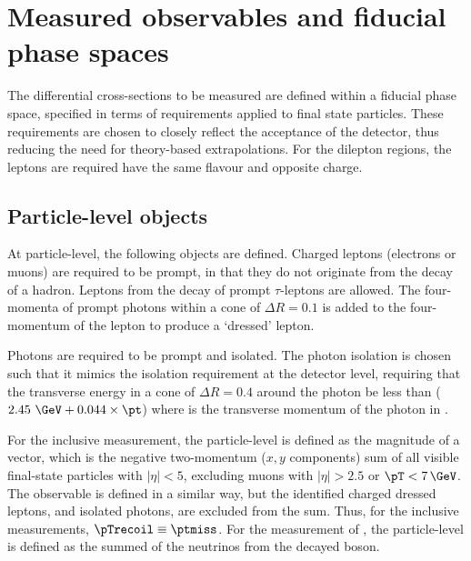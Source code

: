 \documentclass[atlasdraft=false, cernpreprint, UKenglish, texmf, orcidlogo]{atlasdoc}
\begin{document}
 


 
 

\section{Measured observables and fiducial phase spaces}
\label{sec:fiducial}
 
The differential cross-sections to be measured are defined within a fiducial phase space, specified in terms of requirements applied
to final state particles.
These requirements are chosen to closely reflect the acceptance of the detector, thus reducing the need for theory-based
extrapolations. For the dilepton regions, the leptons are required have the same flavour and opposite charge.
 
\subsection{Particle-level objects \label{sec:particlelevelobjects}}
 
At particle-level, the following objects are defined.
Charged leptons (electrons or muons) are required to be prompt, in that they do not originate from the decay of a hadron.
Leptons from the decay of prompt $\tau$-leptons are allowed. The four-momenta of prompt photons within a cone of \(\Delta R = 0.1\) is
added to the four-momentum of the lepton to produce a `dressed' lepton.
 
Photons are required to be prompt and isolated. The photon isolation is chosen such that it mimics the
isolation requirement at the detector level, requiring that the transverse energy in a cone of \(\Delta R = 0.4\) around
the photon be less than ($2.45~\GeV + 0.044 \times \pt$) where \pt is the transverse momentum of the photon in \GeV.
 
For the inclusive \ptmiss measurement, the particle-level \ptmiss is defined as the magnitude of a vector,
which is the negative two-momentum ($x,y$ components) sum of all visible
final-state particles with $|\eta|<5$, excluding muons with $|\eta| > 2.5$ or $\pT < 7\,\GeV$.
The \ptrecoil observable is defined in a similar way, but the identified charged dressed leptons, and isolated photons,
are excluded from the sum. Thus, for the inclusive \ptmiss measurements, $\pTrecoil \equiv \ptmiss$.
For the measurement of \Znunu, the particle-level \ptmiss{} is defined as the summed
\pt{} of the neutrinos from the decayed boson.
 
\end{document}
